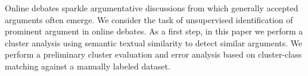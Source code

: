 Online debates sparkle argumentative discussions from which generally accepted arguments often emerge. We consider the task of unsupervised identification of prominent argument in online debates. As a first step, in this paper we perform a cluster analysis using semantic textual similarity to detect similar arguments. We perform a preliminary cluster evaluation and error analysis based on cluster-class matching against a manually labeled dataset.
